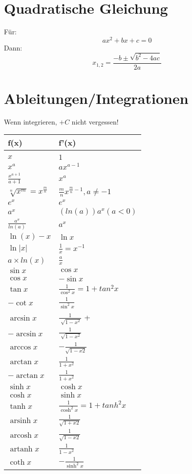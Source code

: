 \documentclass[../main.tex]{subfiles}
\begin{document}
\section{Quadratische Gleichung}
Für:
\[ax^2+bx+c=0\]
Dann:
\[x_{1,2}=\frac{-b\pm\sqrt{b^2-4ac}}{2a}\]

\section{Ableitungen/Integrationen}
Wenn integrieren, $+C$ nicht vergessen! \\ [7pt]
\begin{tabularx}{0.8\textwidth} { 
    >{\centering\arraybackslash}X 
    >{\centering\arraybackslash}X  }
    \hline
    f(x) & f'(x) \\ [7pt]
    \hline \\
    $x$ & $1$
    \\ [7pt]
    $x^a$ & $ax^{a-1}$
    \\ [7pt]
    $\frac{x^{a+1}}{a+1}$ & $x^a$
    \\ [7pt]
    $\sqrt[n]{x^m} = x^{\frac{m}{n}}$ & $\frac{m}{n}x^{\frac{m}{n}-1}, a \neq -1$
    \\ [7pt]
    $e^x$ & $e^x$
    \\ [7pt]
    $a^x$ & $(ln(a))a^x (a<0)$
    \\ [7pt]
    $\frac{a^x}{ln(a)}$ & $a^x$
    \\ [7pt]
    $\ln (x) - x$ & $\ln x$
    \\ [7pt]
    $\ln|x|$ & $\frac{1}{x} = x^{-1}$ 
    \\ [7pt]
    $a \times ln(x)$ & $\frac{a}{x}$
    \\ [7pt]
    $\sin x$ & $\cos x$
    \\ [7pt]
    $\cos x$ & $-\sin x$
    \\ [7pt]
    $\tan x$ & $\frac{1}{\cos ^2x} = 1 + tan ^2 x$
    \\ [7pt]
    $-\cot x$ & $\frac{1}{\sin ^2x}$
    \\ [7pt]
    $\arcsin x$ & $\frac{1}{\sqrt[]{1-x^2}}$ +
    \\ [7pt]
    $-\arcsin x$ & $\frac{1}{\sqrt[]{1-x^2}}$
    \\ [7pt]
    $\arccos x$ & $-\frac{1}{\sqrt{1 - x2}}$
    \\ [7pt]
    $\arctan x$ & $\frac{1}{1 + x^2}$ 
    \\ [7pt]
    $-\arctan x$ & $\frac{1}{1 + x^2}$ 
    \\ [7pt]
    $\sinh x$ & $\cosh x$
    \\ [7pt]
    $\cosh x$ & $\sinh x$
    \\ [7pt]
    $\tanh x$ & $\frac{1}{\cosh ^2x} = 1 + tanh ^2 x$
    \\ [7pt]
    $\operatorname{arsinh} x$ & $\frac{1}{\sqrt{1 + x2}}$
    \\ [7pt]
    $\operatorname{arcosh} x$ & $\frac{1}{\sqrt{1 - x2}}$
    \\ [7pt]
    $\operatorname{artanh} x$ & $\frac{1}{1 - x^2}$ 
    \\ [7pt]
    $\coth x$ & $-\frac{1}{\sinh^2x}$
\end{tabularx} \\ [7pt]
\end{document}
